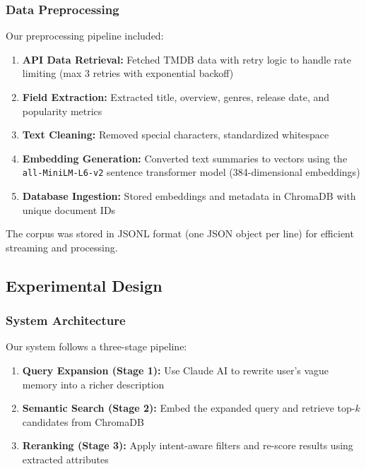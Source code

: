 \documentclass[11pt,a4paper]{article}
\begin{document}
\subsubsection{Data Preprocessing}

Our preprocessing pipeline included:

\begin{enumerate}
    \item \textbf{API Data Retrieval:} Fetched TMDB data with retry logic to handle rate limiting (max 3 retries with exponential backoff)
    \item \textbf{Field Extraction:} Extracted title, overview, genres, release date, and popularity metrics
    \item \textbf{Text Cleaning:} Removed special characters, standardized whitespace
    \item \textbf{Embedding Generation:} Converted text summaries to vectors using the \texttt{all-MiniLM-L6-v2} sentence transformer model (384-dimensional embeddings)
    \item \textbf{Database Ingestion:} Stored embeddings and metadata in ChromaDB with unique document IDs
\end{enumerate}

The corpus was stored in JSONL format (one JSON object per line) for efficient streaming and processing.

\subsection{Experimental Design}

\subsubsection{System Architecture}

Our system follows a three-stage pipeline:

\begin{enumerate}
    \item \textbf{Query Expansion (Stage 1):} Use Claude AI to rewrite user's vague memory into a richer description
    \item \textbf{Semantic Search (Stage 2):} Embed the expanded query and retrieve top-$k$ candidates from ChromaDB
    \item \textbf{Reranking (Stage 3):} Apply intent-aware filters and re-score results using extracted attributes
\end{enumerate}
\end{document}

